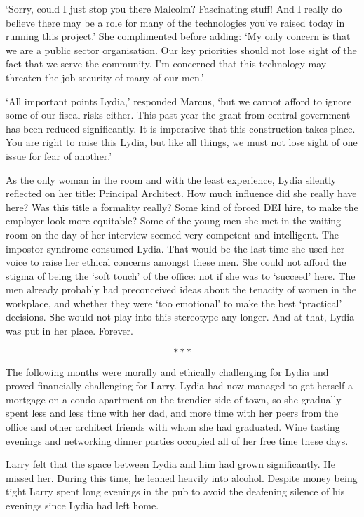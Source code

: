 `Sorry, could I just stop you there Malcolm? Fascinating stuff! And I
really do believe there may be a role for many of the technologies
you've raised today in running this project.' She complimented before
adding: `My only concern is that we are a public sector
organisation. Our key priorities should not lose sight of the fact
that we serve the community. I'm concerned that this technology may
threaten the job security of many of our men.'

`All important points Lydia,' responded Marcus, `but we cannot afford
to ignore some of our fiscal risks either.  This past year the grant
from central government has been reduced significantly. It is
imperative that this construction takes place. You are right to raise
this Lydia, but like all things, we must not lose sight of one issue
for fear of another.'

As the only woman in the room and with the least experience, Lydia
silently reflected on her title: Principal Architect. How much
influence did she really have here? Was this title a formality really?
Some kind of forced DEI hire, to make the employer look more
equitable? Some of the young men she met in the waiting room on the
day of her interview seemed very competent and intelligent. The
impostor syndrome consumed Lydia. That would be the last time she used
her voice to raise her ethical concerns amongst these men. She could
not afford the stigma of being the `soft touch' of the office: not if
she was to `succeed' here. The men already probably had preconceived
ideas about the tenacity of women in the workplace, and whether they
were `too emotional' to make the best `practical' decisions. She would
not play into this stereotype any longer. And at that, Lydia was put
in her place. Forever.

\[***\]

The following months were morally and ethically challenging for Lydia
and proved financially challenging for Larry. Lydia had now managed to
get herself a mortgage on a condo-apartment on the trendier side of
town, so she gradually spent less and less time with her dad, and more
time with her peers from the office and other architect friends with
whom she had graduated. Wine tasting evenings and networking dinner
parties occupied all of her free time these days.

Larry felt that the space between Lydia and him had grown
significantly. He missed her. During this time, he leaned heavily into
alcohol. Despite money being tight Larry spent long evenings in the
pub to avoid the deafening silence of his evenings since Lydia had
left home.

